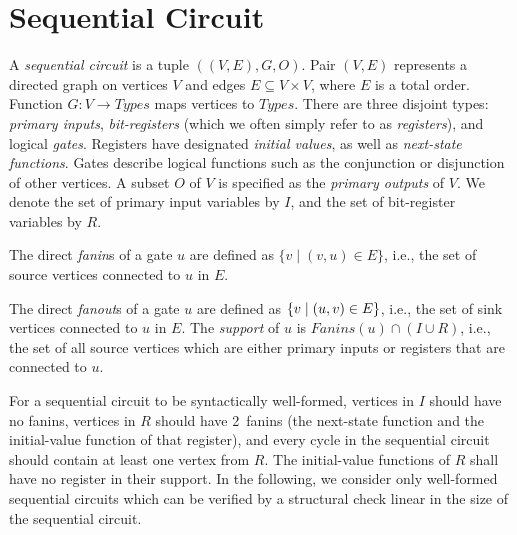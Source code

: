 \section{Sequential Circuit}
\label{sec:sequential}
%
\begin{definition}
A {\em sequential circuit} is a tuple $\left( (V, E),G,
O\right)$.
Pair $(V,E)$ represents a directed graph on
vertices $V$ and edges $E \subseteq V\times V$, where $E$
is a total order.  Function $G: V \to
\mathit{Types}$ maps vertices to $\mathit{Types}$.
There are three disjoint types: {\em primary inputs}, {\em
bit-registers} (which we often simply refer to as {\em
registers}), and logical {\em gates}.  Registers have designated
{\em initial values}, as well as {\em next-state
functions}.  Gates describe logical functions such as
the conjunction or disjunction of other vertices. 
A subset $O$ of $V$ is specified as the {\em
primary outputs} of $V$.  
We denote the set of primary input variables by $I$,
and the set of bit-register variables by $R$.  
\label{def:back:seq_circuit}
\end{definition}
%
\begin{definition}
The direct \emph{fanin}s of a gate $u$ 
are defined as
$\{v \mid (v,u)\in E\}$, i.e., the set of source vertices connected
to $u$ in $E$.  

The direct {\em fanout}s of a gate $u$ are defined as 
$\{ v \mid (u,v) \in E \}$, i.e., 
  the set of sink vertices connected
to $u$ in $E$.
The {\em support} of $u$ 
is $\mathit{Fanins}(u) \cap (I \cup R)$, i.e., the set of all source vertices which are either primary inputs or registers that are connected to $u$.
\label{def:back:fanins} 
\end{definition}
%
%
For a sequential
circuit to be syntactically well-formed, vertices in $I$
should have no fanins, vertices in $R$ should have
2~fanins (the next-state function and the initial-value
function of that register), %
and every cycle in the sequential circuit should contain
at least one vertex from $R$.  The initial-value functions
of $R$ shall have no register in their support.  
In the following, 
we consider only well-formed sequential circuits which can be 
verified by a structural check linear in the size of the 
sequential circuit.
%

